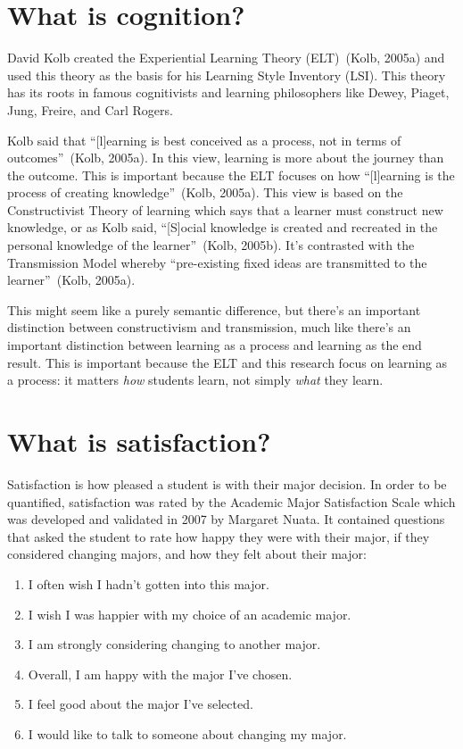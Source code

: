 \section{What is cognition?}
David Kolb created the Experiential Learning Theory (ELT)~(Kolb, 2005a) and used this theory as the basis for his Learning Style Inventory (LSI). This theory has its roots in famous cognitivists and learning philosophers like Dewey, Piaget, Jung, Freire, and Carl Rogers.

Kolb said that ``[l]earning is best conceived as a process, not in terms of outcomes''~(Kolb, 2005a). In this view, learning is more about the journey than the outcome. This is important because the ELT focuses on how ``[l]earning is the process of creating knowledge''~(Kolb, 2005a). This view is based on the Constructivist Theory of learning which says that a learner must construct new knowledge, or as Kolb said, ``[S]ocial knowledge is created and recreated in the personal knowledge of the learner''~(Kolb, 2005b). It's contrasted with the Transmission Model whereby ``pre-existing fixed ideas are transmitted to the learner''~(Kolb, 2005a).

This might seem like a purely semantic difference, but there's an important distinction between constructivism and transmission, much like there's an important distinction between learning as a process and learning as the end result. This is important because the ELT and this research focus on learning as a process: it matters \emph{how} students learn, not simply \emph{what} they learn.

\section{What is satisfaction?}
Satisfaction is how pleased a student is with their major decision. In order to be quantified, satisfaction was rated by the Academic Major Satisfaction Scale which was developed and validated in 2007 by Margaret Nuata. It contained questions that asked the student to rate how happy they were with their major, if they considered changing majors, and how they felt about their major:
\begin{enumerate}
  \item I often wish I hadn't gotten into this major.
  \item I wish I was happier with my choice of an academic major.
  \item I am strongly considering changing to another major.
  \item Overall, I am happy with the major I've chosen.
  \item I feel good about the major I've selected.
  \item I would like to talk to someone about changing my major.
\end{enumerate}

